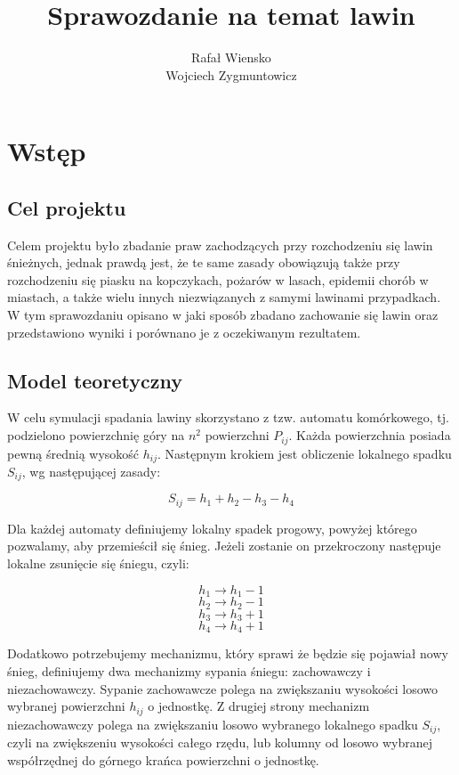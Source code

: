 \documentclass{article}
\author{Rafał Wiensko \\Wojciech Zygmuntowicz}
\title{Sprawozdanie na temat lawin}
\begin{document}
\maketitle

\newpage
 
\section{Wstęp}
	\subsection{Cel projektu}

		Celem projektu było zbadanie praw zachodzących przy rozchodzeniu się lawin śnieżnych, jednak prawdą jest, że te same zasady obowiązują także przy rozchodzeniu się piasku na kopczykach, 
		pożarów w lasach, epidemii chorób w miastach, a także wielu innych niezwiązanych z samymi lawinami przypadkach.  W tym sprawozdaniu opisano w jaki sposób zbadano zachowanie się lawin
		oraz przedstawiono wyniki i porównano je z oczekiwanym rezultatem.

	\subsection{Model teoretyczny}

		W celu symulacji spadania lawiny skorzystano z tzw. automatu komórkowego, tj. podzielono powierzchnię góry na $n^{2}$ powierzchni $P_{i j}$. Każda powierzchnia posiada pewną średnią 
		wysokość $h_{i j}$. Następnym krokiem jest obliczenie lokalnego spadku $S_{i j}$, wg następującej zasady: 
			

			\[ S_{i j} = h_1 + h_2 - h_3 - h_4 \]
			
			
		
		Dla każdej automaty definiujemy lokalny spadek progowy, powyżej którego pozwalamy, aby przemieścił się śnieg. Jeżeli zostanie on przekroczony następuje lokalne zsunięcie się śniegu, czyli:
		
			\[ h_1 \rightarrow h_1 - 1 \]
			\[ h_2 \rightarrow h_2 - 1 \]
			\[ h_3 \rightarrow h_3 + 1 \]						
			\[ h_4 \rightarrow h_4 + 1 \]
			
		Dodatkowo potrzebujemy mechanizmu, który sprawi że będzie się pojawiał nowy śnieg, definiujemy dwa mechanizmy sypania śniegu: zachowawczy i niezachowawczy. Sypanie zachowawcze polega
		na zwiększaniu wysokości losowo wybranej powierzchni $h_{i j}$ o jednostkę. Z drugiej strony mechanizm niezachowawczy polega na zwiększaniu losowo wybranego lokalnego spadku $S_{i j}$, 
		czyli na zwiększeniu wysokości całego rzędu, lub kolumny od losowo wybranej współrzędnej do górnego krańca powierzchni o jednostkę.
		\newline
\end{document}
